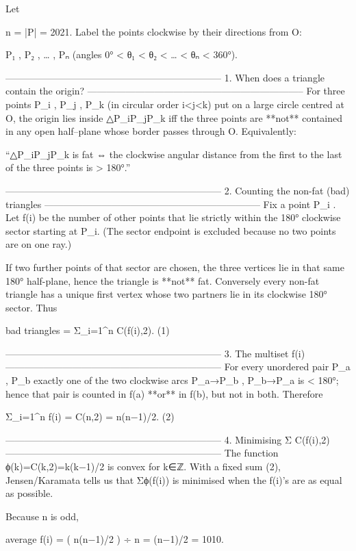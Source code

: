 Let  

n = |P| = 2021.  
Label the points clockwise by their directions from O:  

P₁ , P₂ , … , Pₙ   (angles 0° < θ₁ < θ₂ < … < θₙ < 360°).

--------------------------------------------------------------------
1.  When does a triangle contain the origin?
--------------------------------------------------------------------
For three points P_i , P_j , P_k (in circular order i<j<k) put on a
large circle centred at O, the origin lies inside △P_iP_jP_k
iff the three points are **not** contained in any open half–plane whose
border passes through O.  
Equivalently:

“△P_iP_jP_k is fat  ⇔  the clockwise angular distance from the
first to the last of the three points is > 180°.”

--------------------------------------------------------------------
2.  Counting the non-fat (bad) triangles
--------------------------------------------------------------------
Fix a point P_i .
Let f(i) be the number of other points that lie strictly within
the 180° clockwise sector starting at P_i.
(The sector endpoint is excluded because no two points are on one ray.)

If two further points of that sector are chosen, the three vertices lie
in that same 180° half-plane, hence the triangle is **not** fat.
Conversely every non-fat triangle has a unique first vertex whose two
partners lie in its clockwise 180° sector.  Thus

bad triangles  =  Σ_{i=1}^{n} C(f(i),2).      (1)

--------------------------------------------------------------------
3.  The multiset {f(i)}
--------------------------------------------------------------------
For every unordered pair {P_a , P_b} exactly one of the two
clockwise arcs P_a→P_b , P_b→P_a is < 180°; hence that pair is counted
in f(a) **or** in f(b), but not in both.
Therefore

Σ_{i=1}^{n} f(i) = C(n,2) = n(n−1)/2.          (2)

--------------------------------------------------------------------
4.  Minimising Σ C(f(i),2)
--------------------------------------------------------------------
The function ϕ(k)=C(k,2)=k(k−1)/2 is convex for k∈ℤ.
With a fixed sum (2), Jensen/Karamata tells us that
Σϕ(f(i)) is minimised when the f(i)’s are as equal as possible.

Because n is odd,

average f(i) = ( n(n−1)/2 ) ÷ n = (n−1)/2 = 1010.


